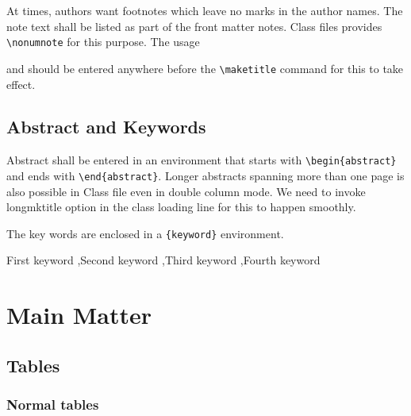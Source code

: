 \documentclass[a4paper,12pt]{article}
\begin{document}
At times, authors want footnotes which leave no marks in
the author names. The note text shall be listed as part of
the front matter notes. Class files provides
\verb+\nonumnote+ for this purpose. The usage

\begin{vquote}
\end{vquote}

\noindent and should be entered anywhere before the \verb+\maketitle+
command for this to take effect. 

\subsection{Abstract and Keywords}

Abstract shall be entered in an environment that starts
with \verb+\begin{abstract}+ and ends with
\verb+\end{abstract}+. Longer abstracts spanning more than
one page is also possible in Class file even in double
column mode. We need to invoke longmktitle option in the
class loading line for this to happen smoothly.

The key words are enclosed in a \verb+{keyword}+
environment.

\begin{vquote}
\begin{abstract}
 This is a abstract. \lipsum[3]
\end{abstract}

\begin{keywords}
 First keyword \sep Second keyword \sep Third 
    keyword \sep Fourth keyword
\end{keywords}
\end{vquote}

\section{Main Matter}
\subsection{Tables}
\subsubsection{Normal tables}
\end{document}
